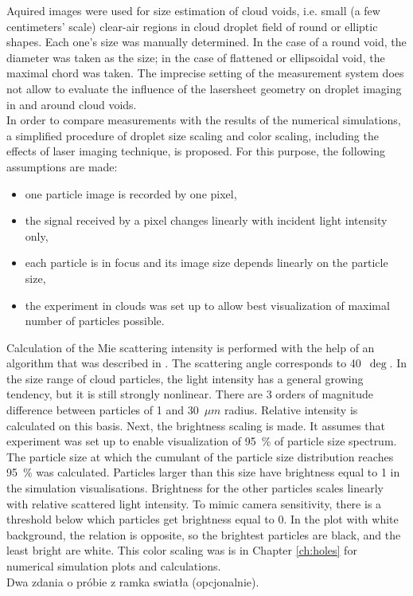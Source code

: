 \documentclass[../main.tex]{subfiles}
\begin{document}
Aquired images were used for size estimation of cloud voids, i.e. small (a few centimeters’ scale) clear-air regions in cloud droplet field of round or elliptic shapes. Each one’s size was manually determined. In the case of a round void, the diameter was taken as the size; in the case of flattened or ellipsoidal void, the maximal chord was taken. The imprecise setting of the measurement system does not allow to evaluate the influence of the lasersheet geometry on droplet imaging in and around cloud voids.  \\
In order to compare measurements with the results of the numerical simulations, a simplified procedure of droplet size scaling and color scaling, including the effects of laser imaging technique, is proposed. For this purpose, the following assumptions are made:
\begin{itemize}
\item one particle image is recorded by one pixel,
\item the signal received by a pixel changes linearly with incident light intensity only,
\item each particle is in focus and its image size depends linearly on the particle size,
\item the experiment in clouds was set up to allow best visualization of maximal number of particles possible.
\end{itemize}
Calculation of the Mie scattering intensity is performed with the help of an algorithm that was described in \citet{Bohren2007}. The scattering angle corresponds to 40~$\deg$. In the size range of cloud particles, the light intensity has a general growing tendency, but it is still strongly nonlinear. There are 3 orders of magnitude difference between particles of 1 and 30~$\mu m$ radius. Relative intensity is calculated on this basis. Next, the brightness scaling is made. It assumes that experiment was set up to enable visualization of 95~\% of particle size spectrum. The particle size at which the cumulant of the particle size distribution reaches 95~\% was calculated. Particles larger than this size have brightness equal to 1 in the simulation visualisations. Brightness for the other particles scales linearly with relative scattered light intensity. To mimic camera sensitivity, there is a threshold below which particles get brightness equal to 0. In the plot with white background, the relation is opposite, so the brightest particles are black, and the least bright are white. This color scaling was is in Chapter \ref{ch:holes} for numerical simulation plots and calculations.\\
Dwa zdania o próbie z ramka swiatła (opcjonalnie).
\end{document}
